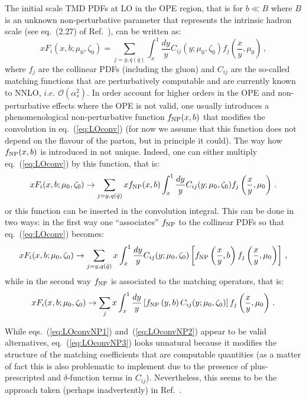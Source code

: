 \documentclass[10pt,a4paper]{article}
\begin{document}
The initial scale TMD PDFs at LO in the OPE region, that is for
$b\ll B$ where $B$ is an unknown non-perturbative parameter that
represents the intrinsic hadron scale (see eq.~(2.27) of
Ref.~\cite{Scimemi:2017etj}), can be written as:
\begin{equation}\label{eq:LOconv}
xF_i(x,b;\mu_0,\zeta_0) = \sum_{j=g,q(\bar{q})}\int_x^1\frac{dy}{y}C_{ij}(y;\mu_0,\zeta_0)f_j\left(\frac{x}{y},\mu_0\right)\,,
\end{equation}
where $f_j$ are the collinear PDFs (including the gluon) and $C_{ij}$
are the so-called matching functions that are perturbatively
computable and are currently known to NNLO, $i.e.$
$\mathcal{O}(\alpha_s^2)$. In order account for higher orders in the
OPE and non-perturbative effects where the OPE is not valid, one
usually introduces a phenomenological non-perturbative function
$f_{\rm NP}(x,b)$ that modifies the convolution in
eq.~(\ref{eq:LOconv}) (for now we assume that this function does not
depend on the flavour of the parton, but in principle it could). The
way how $f_{\rm NP}(x,b)$ is introduced in not unique. Indeed, one can
either multiply eq.~(\ref{eq:LOconv}) by this function, that is:
\begin{equation}\label{eq:LOconvNP1}
xF_i(x,b;\mu_0,\zeta_0) \rightarrow  \sum_{j=g,q(\bar{q})}xf_{\rm NP}(x,b)\int_x^1\frac{dy}{y}C_{ij}(y;\mu_0,\zeta_0)f_j\left(\frac{x}{y},\mu_0\right)\,.
\end{equation}
or this function can be inserted in the convolution integral. This can
be done in two ways: in the first way one ``associates'' $f_{\rm NP}$ to
the collinear PDFs so that eq.~(\ref{eq:LOconv}) becomes:
\begin{equation}\label{eq:LOconvNP2}
xF_i(x,b;\mu_0,\zeta_0) \rightarrow  \sum_{j=g,q(\bar{q})}x\int_x^1\frac{dy}{y}C_{ij}(y;\mu_0,\zeta_0) \left[f_{\rm NP}\left(\frac{x}{y},b\right) f_j\left(\frac{x}{y},\mu_0\right)\right]\,,
\end{equation}
while in the second way $f_{\rm NP}$ is associated to the matching
operators, that is:
\begin{equation}\label{eq:LOconvNP3}
xF_i(x,b;\mu_0,\zeta_0) \rightarrow
\sum_{j}x\int_x^1\frac{dy}{y}\left[f_{\rm
    NP}\left(y,b\right) C_{ij}(y;\mu_0,\zeta_0)\right]  f_j\left(\frac{x}{y},\mu_0\right)\,.
\end{equation}

While eqs.~(\ref{eq:LOconvNP1}) and~(\ref{eq:LOconvNP2}) appear to be
valid alternatives, eq.~(\ref{eq:LOconvNP3}) looks unnatural because
it modifies the structure of the matching coefficients that are
computable quantities (as a matter of fact this is also problematic to
implement due to the presence of plus-prescripted and
$\delta$-function terms in $C_{ij}$). Nevertheless, this seems to be
the approach taken (perhaps inadvertently) in
Ref.~\cite{Scimemi:2017etj}.
\end{document}
